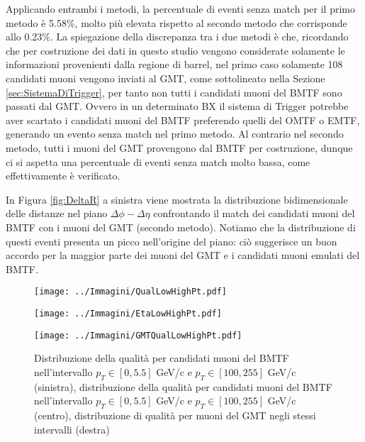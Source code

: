 Applicando entrambi i metodi, la percentuale di eventi senza match per il primo metodo è 5.58\%, molto più elevata rispetto al secondo metodo che corrisponde allo 0.23\%. La spiegazione della discrepanza tra i due metodi è che, ricordando che per costruzione dei dati in questo studio vengono considerate solamente le informazioni provenienti dalla regione di barrel, nel primo caso solamente 108 candidati muoni vengono inviati al GMT, come sottolineato nella Sezione \ref{sec:SistemaDiTrigger}, per tanto non tutti i candidati muoni del BMTF sono passati dal GMT. Ovvero in un determinato BX il sistema di Trigger potrebbe aver scartato i candidati muoni del BMTF preferendo quelli del OMTF o EMTF, generando un evento senza match nel primo metodo. \newline
Al contrario nel secondo metodo, tutti i muoni del GMT provengono dal BMTF per costruzione, dunque ci si aspetta una percentuale di eventi senza match molto bassa, come effettivamente è verificato.

In Figura \ref{fig:DeltaR} a sinistra viene mostrata la distribuzione bidimensionale delle distanze nel piano $\Delta \phi - \Delta \eta$ confrontando il match dei candidati muoni del BMTF con i muoni del GMT (secondo metodo). Notiamo che la distribuzione di questi eventi presenta un picco nell'origine del piano: ciò suggerisce un buon accordo per la maggior parte dei muoni del GMT e i candidati muoni emulati del BMTF.



\begin{figure}[t]
  \centering
  \begin{minipage}{0.32\textwidth}
      \centering
      \texttt{[image: ../Immagini/QualLowHighPt.pdf]}
  \end{minipage}%
  \hfill %
  \begin{minipage}{0.32\textwidth}
      \centering
      \texttt{[image: ../Immagini/EtaLowHighPt.pdf]}
  \end{minipage}%
  \hfill
  \begin{minipage}{0.32\textwidth}
      \centering
      \texttt{[image: ../Immagini/GMTQualLowHighPt.pdf]}
  \end{minipage}
  \caption{Distribuzione della qualità per candidati muoni del BMTF nell'intervallo $p_T \in [0, 5.5]$ GeV/c e $p_T \in [100, 255]$ GeV/c (sinistra), distribuzione della qualità per candidati muoni del BMTF nell'intervallo $p_T \in [0, 5.5]$ GeV/c e $p_T \in [100, 255]$ GeV/c (centro), distribuzione di qualità per muoni del GMT negli stessi intervalli (destra)}
  \label{fig:MatchingEfficiecyLowPt}
\end{figure}





